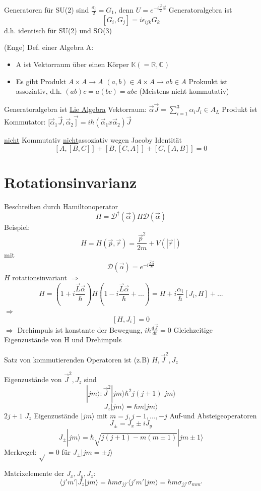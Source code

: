 Generatoren für SU(2) sind \(\frac {\sigma_i} 2 = G_1\), denn \(U=e^{-i \frac {\vec
    \sigma} 2 \vec \alpha}\) Generatoralgebra ist
\[ [G_i,G_j]=i\epsilon_{ijk}G_k\]
d.h. identisch für SU(2) und SO(3)

(Enge) Def. einer Algebra A:
\begin{itemize}
\item A ist Vektorraum über einen Körper \(\mathbb K (=\mathbb R,\mathbb C)\)
\item Es gibt Produkt \(A\times A\rightarrow A\)
\((a,b)\in A\times A \rightarrow a b \in A\)
Prokuukt ist assoziativ, d.h. \((ab)c=a(bc)=abc\)
(Meistens nicht kommutativ)
\end{itemize}
Generatoralgebra ist \underline{Lie Algebra}
Vektorraum: \(\vec \alpha\vec J=\sum_{i=1}^3\alpha_iJ_i \in A_L\)
Produkt ist Kommutator:
\([\vec\alpha_1\vec J,\vec\alpha_2\vec ]=i\hbar(\vec\alpha_1x\vec\alpha_2)\vec J\)

\underline{nicht} Kommutativ
\underline{nicht}assoziativ wegen Jacoby Identität
\[[A,[B,C]]+[B,[C,A]]+[C,[A,B]]=0\]



\section{Rotationsinvarianz}
Beschreiben durch Hamiltonoperator
\[H=\mathcal D^\dagger(\vec \alpha)H\mathcal D(\vec\alpha)\]
Beispiel:
\[H= H(\vec p,\vec r)=\frac {\vec p^2}{2m}+V(|\vec r|)\]
mit 
\[\mathcal D(\vec\alpha)=e^{-i\frac {\vec L\vec\alpha}{\hbar}}\]
\(H\) rotationsinvariant \(\Rightarrow\)
\[H=(1+i\frac {\vec L\vec\alpha}{\hbar})H(1-i\frac {\vec L\vec\alpha}{\hbar}+...)=H+i\frac{\alpha_i}{\hbar}[J_i,H]+...\]
\(\Rightarrow\)
\[[H,J_i]=0\]
\(\Rightarrow\) Drehimpuls ist konstante der Bewegung, \(i\hbar\frac{d\vec
  J}{dt}=0\)
Gleichzeitige Eigenzustände von H und Drehimpuls

Satz von kommutierenden Operatoren ist (z.B) \(H, \vec J^2,J_z\)

Eigenzustände von \(\vec J^2,J_z\) sind 
\[|jm\rangle : \vec J^2|jm\rangle \hbar^2j(j+1)|jm\rangle \]
\[J_z|jm\rangle =\hbar m|jm\rangle \]
\(2j+1\) \(J_z\) Eigenzustände \(|jm\rangle \) mit \(m=j,j-1,...,-j\)
Auf-und Absteigeoperatoren
\[J_{\pm}=J_x\pm iJ_y\]
\[J_\pm|jm\rangle =\hbar\sqrt{j(j+1)-m(m\pm1)}|j m\pm 1\rangle \]
Merkregel: \(\sqrt{}=0\) für \(J_\pm|jm=\pm j\rangle \)

Matrixelemente der \(J_x,J_y,J_z\): 
\[\langle j'm'|J_z|jm\rangle =\hbar m\sigma_{jj'}\langle j'm'|jm\rangle =\hbar m \sigma_{jj'}\sigma_{mm'}\]

